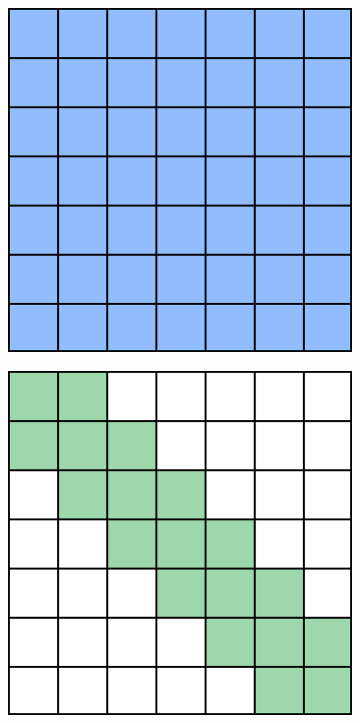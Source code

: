 \begin{figure}
    \begin{subfigure}{0.15\textwidth}
        \centering
        \includegraphics[width=\textwidth]{./img/full_attention.png}
        \caption{}\label{fig:attn_pattern_full}
    \end{subfigure}
    \begin{subfigure}{0.15\textwidth}
        \centering
        \includegraphics[width=\textwidth]{./img/local_attention.png}

\end{subfigure}
\end{figure}
